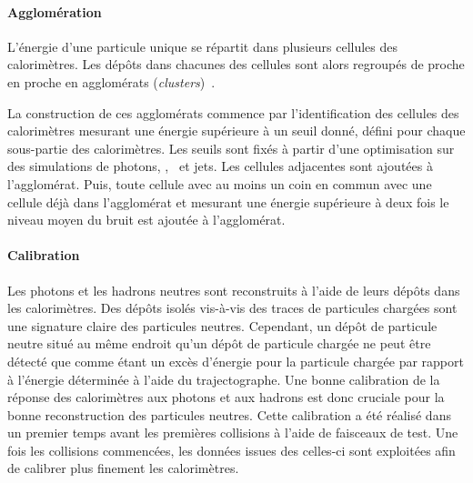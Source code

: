 \paragraph{Agglomération}
L'énergie d'une particule unique se répartit dans plusieurs cellules des calorimètres.
Les dépôts dans chacunes des cellules sont alors regroupés de proche en proche en agglomérats (\emph{clusters})~\cite{particle-flow}.
\par La construction de ces agglomérats commence par l'identification des cellules des calorimètres mesurant une énergie supérieure à un seuil donné, défini pour chaque sous-partie des calorimètres.
Les seuils sont fixés à partir d'une optimisation sur des simulations de photons, \pionnull, \Kaonnull\ et jets.
Les cellules adjacentes sont ajoutées à l'agglomérat.
Puis, toute cellule avec au moins un coin en commun avec une cellule déjà dans l'agglomérat et mesurant une énergie supérieure à deux fois le niveau moyen du bruit est ajoutée à l'agglomérat.
\paragraph{Calibration}
Les photons et les hadrons neutres sont reconstruits à l'aide de leurs dépôts dans les calorimètres.
Des dépôts isolés vis-à-vis des traces de particules chargées sont une signature claire des particules neutres.
Cependant, un dépôt de particule neutre situé au même endroit qu'un dépôt de particule chargée ne peut être détecté que comme étant un excès d'énergie pour la particule chargée par rapport à l'énergie déterminée à l'aide du trajectographe.
Une bonne calibration de la réponse des calorimètres aux photons et aux hadrons est donc cruciale pour la bonne reconstruction des particules neutres.
Cette calibration a été réalisé dans un premier temps avant les premières collisions à l'aide de faisceaux de test.
Une fois les collisions commencées, les données issues des celles-ci sont exploitées afin de calibrer plus finement les calorimètres.
